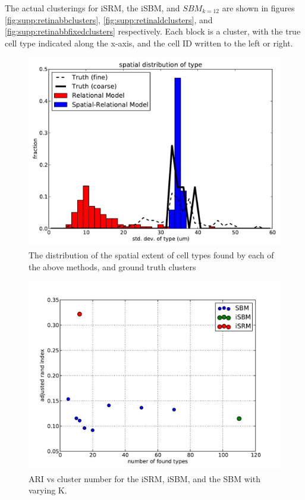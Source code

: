\documentclass{article}
\begin{document}
The actual clusterings for iSRM, the iSBM, and $SBM_{k=12}$ are shown
in figures \ref{fig:supp:retinabbclusters},
\ref{fig:supp:retinaldclusters}, and
\ref{fig:supp:retinabbfixedclusters} respectively. Each block is a
cluster, with the true cell type indicated along the x-axis, and the
cell ID written to the left or right.


\begin{figure}[h!]
  \centering 
    \centerline{\includegraphics[width=5in]{mouseretina/spatial_var.pdf}}
  \caption{The distribution of the spatial extent of cell types found by each of
the above methods, and ground truth clusters}
\label{fig:supp:irmspatialcomparemouse}
\end{figure}

\begin{figure}[h!]
  \centering 
    \centerline{\includegraphics[width=5in]{mouseretina/ari_vs_cluster.pdf}}
  \caption{ARI vs cluster number for the iSRM, iSBM, and the SBM with varying K.}
\label{fig:supp:mousecompareari}
\end{figure}
\end{document}
